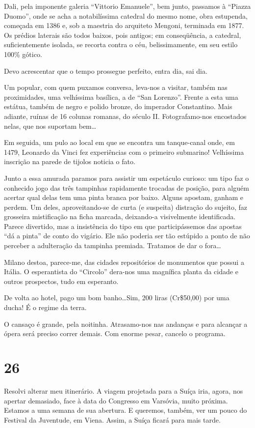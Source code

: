 Dali, pela imponente galeria ``Vittorio Emanuele'', bem junto, passamos à ``Piazza Duomo'', onde se acha a notabilíssima catedral do mesmo nome, obra estupenda, começada em 1386 e, sob a maestria do arquiteto Mengoni, terminada em 1877. Os prédios laterais são todos baixos, pois antigos; em conseqüência, a catedral, suficientemente isolada, se recorta contra o céu, belissimamente, em seu estilo 100\% gótico.

Devo acrescentar que o tempo prossegue perfeito, entra dia, sai dia.

Um popular, com quem puxamos conversa, leva-nos a visitar, também nas proximidades, uma velhíssima basílica, a de ``San Lorenzo''. Frente a esta uma estátua, também de negro e polido bronze, do imperador Constantino. Mais adiante, ruínas de 16 colunas romanas, do século II. Fotografamo-nos encostados nelas, que nos suportam bem\ldots

Em seguida, um pulo ao local em que se encontra um tanque-canal onde, em 1479, Leonardo da Vinci fez experiências com o primeiro submarino! Velhíssima inscrição na parede de tijolos noticia o fato.

Junto a essa amurada paramos para assistir um espetáculo curioso: um tipo faz o conhecido jogo das três tampinhas rapidamente trocadas de posição, para alguém acertar qual delas tem uma pinta branca por baixo. Alguns apostam, ganham e perdem. Um deles, aproveitando-se de curta (e suspeita) distração do sujeito, faz grosseira mistificação na ficha marcada, deixando-a visivelmente identificada. Parece divertido, mas a insistência do tipo em que participássemos das apostas ``dá a pinta'' de conto do vigário. Ele não poderia ser tão estúpido a ponto de não perceber a adulteração da tampinha premiada. Tratamos de dar o fora\ldots

Milano destoa, parece-me, das cidades repositórios de monumentos que possui a Itália. O esperantista do ``Circolo'' dera-nos uma magnífica planta da cidade e outros prospectos, tudo em esperanto.

De volta ao hotel, pago um bom banho\ldots Sim, 200 liras (Cr\$50,00) por uma ducha! É o regime da terra.

O cansaço é grande, pela noitinha. Atrasamo-nos nas andanças e para alcançar a ópera será preciso correr demais. Com enorme pesar, cancelo o programa.

\section*{26 \adfflatleafright {}}
Resolvi alterar meu itinerário. A viagem projetada para a Suíça iria, agora, nos apertar demasiado, face à data do Congresso em Varsóvia, muito próxima. Estamos a uma semana de sua abertura. E queremos, também, ver um pouco do Festival da Juventude, em Viena. Assim, a Suíça ficará para mais tarde.

